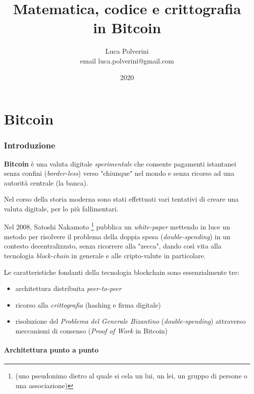 \documentclass{article}
\title{Matematica, codice e crittografia in Bitcoin}
\author{Luca Polverini \\ email luca.polverini@gmail.com}
\date{2020}
\begin{document}
\maketitle


\newpage

\tableofcontents

\newpage

\part{Bitcoin}

\section{Introduzione}

\textbf{Bitcoin} è una valuta digitale \textit{sperimentale} che consente pagamenti istantanei senza confini (\textit{border-less})
verso "chiunque" nel mondo e senza ricorso ad una autorità centrale (la banca).

Nel corso della storia moderna sono stati effettuati vari tentativi di creare una valuta digitale, per lo più fallimentari.

Nel 2008, Satoshi Nakamoto \footnote{(uno pseudonimo dietro al quale si cela un lui, un lei, un gruppo di persone o una associazione)} 
pubblica un \textit{white-paper}\cite{Nakamoto} mettendo in luce un metodo per risolvere il problema della doppia spesa (\textit{double-spending})
in un contesto decentralizzato, senza ricorrere alla "zecca", dando così vita alla tecnologia \textit{block-chain} in generale e alle cripto-valute in particolare.

Le caratteristiche fondanti della tecnologia blockchain sono essenzialmente tre:

\begin{itemize}
    \item architettura distribuita \textit{peer-to-peer}
    \item ricorso alla \textit{crittografia} (hashing e firma digitale)
    \item risoluzione del \textit{Problema del Generale Bizantino} (\textit{double-spending}) attraverso meccanismi di consenso (\textit{Proof of Work} in Bitcoin)
\end{itemize}

\subsection{Architettura punto a punto}
\end{document}
